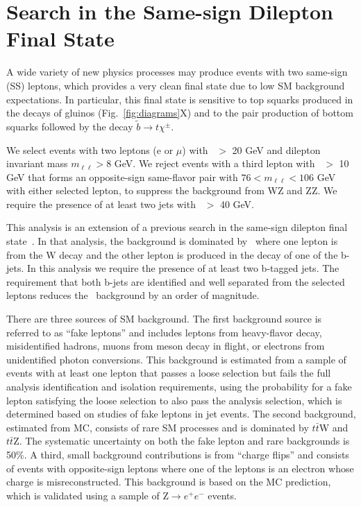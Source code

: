 \section{Search in the Same-sign Dilepton Final State}
\label{sec:ss}

A wide variety of new physics processes may produce events with two same-sign (SS) leptons, which provides a very clean
final state due to low SM background expectations. In particular, this final state is sensitive to top
squarks produced in the decays of gluinos (Fig.~\ref{fig:diagrams}X) and to the pair production of bottom squarks
followed by the decay $\tilde{b}\to t \chi^{\pm}$. 

We select events with two leptons (e or $\mu$) with \pt\ $>$ 20 GeV and dilepton invariant mass $m_{\ell\ell}>8$ GeV. 
We reject events with a third lepton with \pt\ $>$ 10 GeV that forms an opposite-sign
same-flavor pair with $76 < m_{\ell\ell} < 106$ GeV with either selected lepton, to suppress
the background from WZ and ZZ. We require the presence of at least two jets with \pt\ $>$ 40 GeV.

This analysis is an extension of a previous search in the same-sign dilepton final state~\cite{ref:ss_inclusive}.
In that analysis, the background is dominated by \ttljets\ where one lepton is from the W decay and the other
lepton is produced in the decay of one of the b-jets. In this analysis we require the presence of at least two
b-tagged jets. The requirement that both b-jets are identified and well separated from the selected leptons
reduces the \ttljets\ background by an order of magnitude. 

There are three sources of SM background. 
The first background source is referred to as ``fake leptons'' and includes leptons from heavy-flavor decay, misidentified hadrons, 
muons from meson decay in flight, or electrons from unidentified photon conversions. 
This background is estimated from a sample of events with at least one lepton that passes a loose selection but fails the full analysis
identification and isolation requirements, using the probability for a fake lepton satisfying the loose selection to also pass the analysis
selection, which is determined based on studies of fake leptons in jet events.
The second background, estimated from MC, consists of rare SM processes and is dominated by $t\bar{t}$W and $t\bar{t}$Z.
The systematic uncertainty on both the fake lepton and rare backgrounds is 50\%. 
A third, small background contributions is from ``charge flips'' and consists of events with opposite-sign leptons where one of the leptons
is an electron whose charge is misreconstructed. This background is based on the MC prediction, which is validated using a sample of Z$\to e^+e^-$ events.


